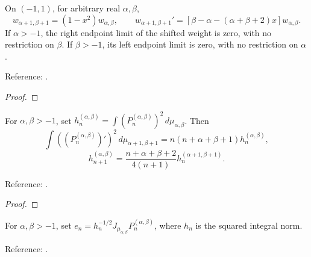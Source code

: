 \begin{supporting}
\begin{theorem}
\label{thm:jacobi-weight-calculus}
\leanok
On $(-1,1)$, for arbitrary real $\alpha,\beta$,
\[w_{\alpha+1,\beta+1}=(1-x^2)w_{\alpha,\beta},\qquad
w_{\alpha+1,\beta+1}'=[\beta-\alpha-(\alpha+\beta+2)x]w_{\alpha,\beta}.\]
If $\alpha>-1$, the right endpoint limit of the shifted weight is zero,
with no restriction on $\beta$. If $\beta>-1$, its left endpoint limit is zero,
with no restriction on $\alpha$.

Reference: \cite[Tables 18.3.1 and 18.8.1]{dlmf}.
\end{theorem}
\begin{proof}
\leanok
\end{proof}

\begin{theorem}
\label{thm:jacobi-energy}
\leanok
For $\alpha,\beta>-1$, set $h_n^{(\alpha,\beta)}=\int(P_n^{(\alpha,\beta)})^2\,d\mu_{\alpha,\beta}$.
Then
\[\int ((P_n^{(\alpha,\beta)})')^2\,d\mu_{\alpha+1,\beta+1}
 =n(n+\alpha+\beta+1)h_n^{(\alpha,\beta)},\]
\[h_{n+1}^{(\alpha,\beta)}=\frac{n+\alpha+\beta+2}{4(n+1)}h_n^{(\alpha+1,\beta+1)}.\]

Reference: \cite[18.9.15, Tables 18.3.1 and 18.8.1]{dlmf}.
\end{theorem}
\begin{proof}
\leanok
\end{proof}

\begin{definition}
\label{def:jacobi-normalised}
\leanok
For $\alpha,\beta>-1$, set $e_n=h_n^{-1/2}J_{\mu_{\alpha,\beta}}P_n^{(\alpha,\beta)}$, where $h_n$ is the squared integral norm.

Reference: \cite[Table 18.3.1]{dlmf}.
\end{definition}

\end{supporting}

